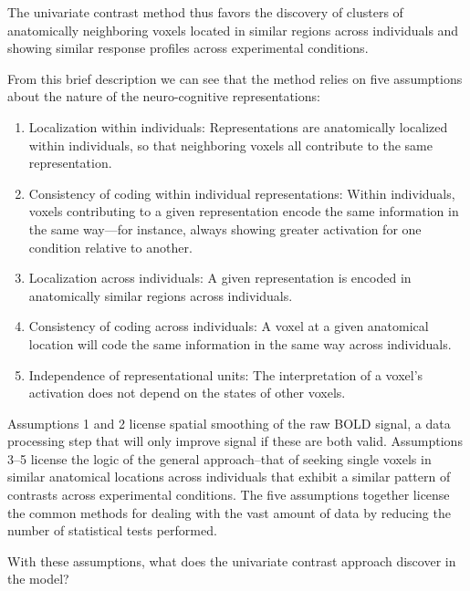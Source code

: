 The univariate contrast method thus favors the discovery of clusters of anatomically neighboring voxels located in similar regions across individuals and showing similar response profiles across experimental conditions. 

From this brief description we can see that the method relies on five assumptions about the nature of the neuro-cognitive representations:

\begin{enumerate}
\item Localization within individuals: Representations are anatomically localized within individuals, so that neighboring voxels all contribute to the same representation.

\item Consistency of coding within individual representations: Within individuals, voxels contributing to a given representation encode the same information in the same way---for instance, always showing greater activation for one condition relative to another.

\item Localization across individuals: A given representation is encoded in anatomically similar regions across individuals.

\item Consistency of coding across individuals: A voxel at a given anatomical location will code the same information in the same way across individuals.

\item Independence of representational units: The interpretation of a voxel's activation does not depend on the states of other voxels.
\end{enumerate}


Assumptions 1 and 2 license spatial smoothing of the raw BOLD signal, a data processing step that will only improve signal if these are both valid. Assumptions 3--5 license the logic of the general approach--that of seeking single voxels in similar anatomical locations across individuals that exhibit a similar pattern of contrasts across experimental conditions. The five assumptions together license the common methods for dealing with the vast amount of data by reducing the number of statistical tests performed. 

With these assumptions, what does the univariate contrast approach discover in the model?

